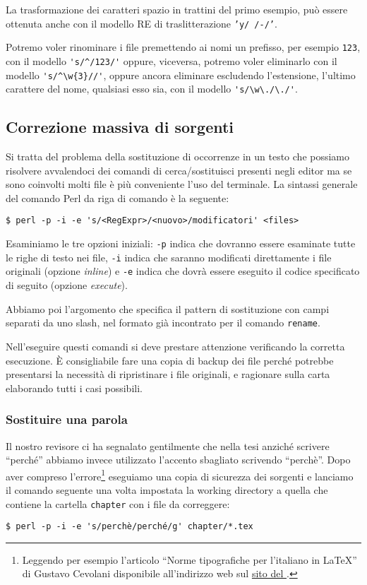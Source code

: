 La trasformazione dei caratteri spazio in trattini del primo esempio, può essere
ottenuta anche con il modello RE di traslitterazione \texttt{'y/ /-/'}.

Potremo voler rinominare i file premettendo ai nomi un prefisso, per esempio
\texttt{123}, con il modello \verb='s/^/123/'= oppure, viceversa, potremo voler
eliminarlo con il modello \verb='s/^\w{3}//'=, oppure ancora eliminare
escludendo l'estensione, l'ultimo carattere del nome, qualsiasi esso sia, con il
modello \verb='s/\w\./\./'=.


\subsection{Correzione massiva di sorgenti}

Si tratta del problema della sostituzione di occorrenze in un testo che possiamo
risolvere avvalendoci dei comandi di cerca/sostituisci presenti negli editor ma
se sono coinvolti molti file è più conveniente l'uso del terminale. La sintassi
generale del comando Perl da riga di comando è la seguente:
\begin{verbatim}
$ perl -p -i -e 's/<RegExpr>/<nuovo>/modificatori' <files>
\end{verbatim}

Esaminiamo le tre opzioni iniziali: \texttt{-p} indica che dovranno essere
esaminate tutte le righe di testo nei file, \texttt{-i} indica che saranno
modificati direttamente i file originali (opzione \emph{inline}) e \texttt{-e}
indica che dovrà essere eseguito il codice specificato di seguito (opzione
\emph{execute}).

Abbiamo poi l'argomento che specifica il pattern di sostituzione con campi
separati da uno slash, nel formato già incontrato per il comando
\texttt{rename}.

Nell'eseguire questi comandi si deve prestare attenzione verificando la corretta
esecuzione. \`E consigliabile fare una copia di backup dei file perché potrebbe
presentarsi la necessità di ripristinare i file originali, e ragionare sulla
carta elaborando tutti i casi possibili.


\subsubsection{Sostituire una parola}

Il nostro revisore ci ha segnalato gentilmente che nella tesi anziché scrivere
``perché'' abbiamo invece utilizzato l'accento sbagliato scrivendo ``perchè''.
Dopo aver compreso l'errore\footnote{Leggendo per esempio l'articolo ``Norme
tipografiche per l’italiano in \LaTeX'' di Gustavo Cevolani disponibile
all'indirizzo web sul
\href{http://www.guitex.org/home/images/ArsTeXnica/AT001/norme\%20tipografiche\%20per\%20litaliano\%20in\%20latex.pdf}{sito
del \GuIT*}.} eseguiamo una copia di sicurezza dei sorgenti e lanciamo il
comando seguente una volta impostata la working directory a quella che contiene
la cartella \texttt{chapter} con i file da correggere:
\begin{verbatim}
$ perl -p -i -e 's/perchè/perché/g' chapter/*.tex
\end{verbatim}

